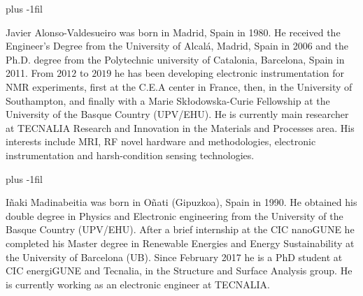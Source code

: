 \documentclass[journal,twoside,web]{ieeecolor}
\begin{document}


\baselineskip plus -1fil
\begin{IEEEbiography}{Javier Alonso-Valdesueiro}
was born in Madrid, Spain in 1980. He received the Engineer's Degree from the University of Alcalá, Madrid, Spain in 2006 and the Ph.D. degree from the Polytechnic university of Catalonia, Barcelona, Spain in 2011.
From $2012$ to $2019$ he has been developing electronic instrumentation for NMR experiments, first at the C.E.A center in France, then, in the University of Southampton, and finally with a Marie Skłodowska-Curie Fellowship at the University of the Basque Country (UPV/EHU). He is currently main researcher at TECNALIA Research and Innovation in the Materials and Processes area.  His interests include MRI, RF novel hardware and methodologies, electronic instrumentation and harsh-condition sensing technologies.
\end{IEEEbiography}
\baselineskip plus -1fil
\begin{IEEEbiography}{Iñaki Madinabeitia}
was born in Oñati (Gipuzkoa), Spain in 1990. He obtained his double degree in Physics and Electronic engineering from the University of the Basque Country (UPV/EHU). After a brief internship at the CIC nanoGUNE he completed his Master degree in Renewable Energies and Energy Sustainability at the University of Barcelona (UB). Since February 2017 he is a PhD student at CIC energiGUNE and Tecnalia, in the Structure and Surface Analysis group. He is currently working as an electronic engineer at TECNALIA.
\end{IEEEbiography}
\end{document}
